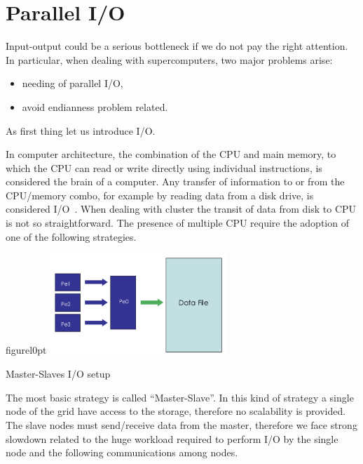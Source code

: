 \section{Parallel I/O}

Input-output could be a serious bottleneck if we do not pay the right attention.
In particular, when dealing with supercomputers, two major problems arise:
\begin{itemize}
\item needing of parallel I/O,
\item avoid endianness problem related.
\end{itemize}
As first thing let us introduce I/O.\par
In computer architecture, the combination of the CPU and main memory, to which the CPU can read or write directly using individual instructions, is considered the brain of a computer. Any transfer of information to or from the CPU/memory combo, for example by reading data from a disk drive, is considered I/O~\cite{io}.
When dealing with cluster the transit of data from disk to CPU is not so straightforward. The presence of multiple CPU require the adoption of one of the following strategies.\par
\begin{wrapfloat}{figure}{l}{0pt}
\includegraphics[width=0.5\textwidth]{grafici/masterslave}
\caption{Master-Slaves I/O setup}
\end{wrapfloat}
The most basic strategy is called ``Master-Slave''. In this kind of strategy a single node of the grid have access to the storage, therefore no scalability is provided. The slave nodes must send/receive data from the master, therefore we face strong slowdown related to the huge workload required to perform I/O by the single node and the following communications among nodes.\\

